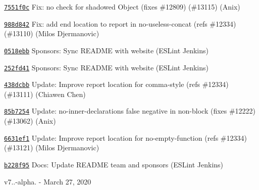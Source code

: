 \begin{DoxyItemize}
\item \href{https://github.com/eslint/eslint/commit/7551f0c6fd12f0295cc7d6377bf1899c092e79d8}{\texttt{ {\ttfamily 7551f0c}}} Fix\+: no check for shadowed Object (fixes \#12809) (\#13115) (Anix)
\item \href{https://github.com/eslint/eslint/commit/988d8428811934943ce13b2d8b833d795ac2bb4a}{\texttt{ {\ttfamily 988d842}}} Fix\+: add end location to report in no-\/useless-\/concat (refs \#12334) (\#13110) (Milos Djermanovic)
\item \href{https://github.com/eslint/eslint/commit/0518ebb840b5bf2d646dbd8a9b3e246e7069eb79}{\texttt{ {\ttfamily 0518ebb}}} Sponsors\+: Sync README with website (ESLint Jenkins)
\item \href{https://github.com/eslint/eslint/commit/252fd4133805f003151e0220b5d89bbb70cfacb1}{\texttt{ {\ttfamily 252fd41}}} Sponsors\+: Sync README with website (ESLint Jenkins)
\item \href{https://github.com/eslint/eslint/commit/438dcbb981214d67e8848006ce45afc0fbfa1705}{\texttt{ {\ttfamily 438dcbb}}} Update\+: Improve report location for comma-\/style (refs \#12334) (\#13111) (Chiawen Chen)
\item \href{https://github.com/eslint/eslint/commit/85b72548c0c893499c787b82f404348e1b50354d}{\texttt{ {\ttfamily 85b7254}}} Update\+: no-\/inner-\/declarations false negative in non-\/block (fixes \#12222) (\#13062) (Anix)
\item \href{https://github.com/eslint/eslint/commit/6631ef1678bbdd48680fb3025c3692abd0aeec4a}{\texttt{ {\ttfamily 6631ef1}}} Update\+: Improve report location for no-\/empty-\/function (refs \#12334) (\#13121) (Milos Djermanovic)
\item \href{https://github.com/eslint/eslint/commit/b228f958afaf507d6f6f99c90b2075b395733839}{\texttt{ {\ttfamily b228f95}}} Docs\+: Update README team and sponsors (ESLint Jenkins)
\end{DoxyItemize}

v7..-\/alpha. -\/ March 27, 2020


